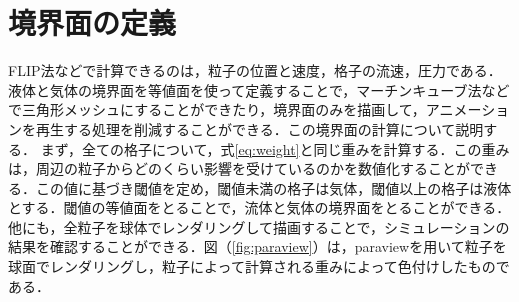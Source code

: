 \documentclass[a4j,12pt]{jreport}
\begin{document}
\section{境界面の定義} \label{sec:boundaly_def}
FLIP法などで計算できるのは，粒子の位置と速度，格子の流速，圧力である．液体と気体の境界面を等値面を使って定義することで，マーチンキューブ法などで三角形メッシュにすることができたり，境界面のみを描画して，アニメーションを再生する処理を削減することができる．この境界面の計算について説明する．
まず，全ての格子について，式\ref{eq:weight}と同じ重みを計算する．この重みは，周辺の粒子からどのくらい影響を受けているのかを数値化することができる．この値に基づき閾値を定め，閾値未満の格子は気体，閾値以上の格子は液体とする．閾値の等値面をとることで，流体と気体の境界面をとることができる．他にも，全粒子を球体でレンダリングして描画することで，シミュレーションの結果を確認することができる．図（\ref{fig:paraview}）は，paraviewを用いて粒子を球面でレンダリングし，粒子によって計算される重みによって色付けしたものである．
\end{document}
